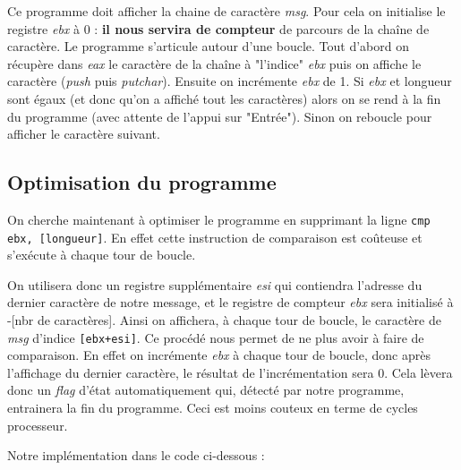 \noindent Ce programme doit afficher la chaine de caractère \textit{msg}. Pour cela on initialise le registre \textit{ebx} à 0 : \textbf{il nous servira de compteur} de parcours de la chaîne de caractère. Le programme s'articule autour d'une boucle. Tout d'abord on récupère dans \textit{eax} le caractère de la chaîne à "l'indice" \textit{ebx} puis on affiche le caractère (\textit{push} puis \textit{putchar}). Ensuite on incrémente \textit{ebx} de 1. Si \textit{ebx} et longueur sont égaux (et donc qu'on a affiché tout les caractères) alors on se rend à la fin du programme (avec attente de l'appui sur "Entrée"). Sinon on reboucle pour afficher le caractère suivant.

\subsection{Optimisation du programme}

On cherche maintenant à optimiser le programme en supprimant la ligne \lstinline{cmp ebx, [longueur]}. En effet cette instruction de comparaison est coûteuse et s'exécute à chaque tour de boucle.

\medskip

On utilisera donc un registre supplémentaire \textit{esi} qui contiendra l'adresse du dernier caractère de notre message, et le registre de compteur \textit{ebx} sera initialisé à -[nbr de caractères]. Ainsi on affichera, à chaque tour de boucle, le caractère de \textit{msg} d'indice \lstinline{[ebx+esi]}.
Ce procédé nous permet de ne plus avoir à faire de comparaison. En effet on incrémente \textit{ebx} à chaque tour de boucle, donc après l'affichage du dernier caractère, le résultat de l'incrémentation sera 0. Cela lèvera donc un \textit{flag} d'état automatiquement qui, détecté par notre programme, entrainera la fin du programme. Ceci est moins couteux en terme de cycles processeur.

Notre implémentation dans le code ci-dessous :

